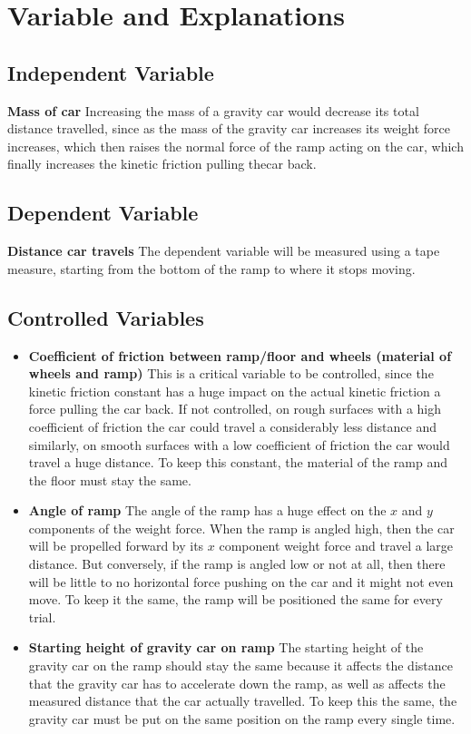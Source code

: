 \documentclass[12pt]{article}
\begin{document}
\section{Variable and Explanations}

\subsection{Independent Variable} \textbf{Mass of car} Increasing the mass of a gravity car would decrease its total distance travelled, since as the mass of the gravity car increases its weight force increases, which then raises the normal force of the ramp acting on the car, which finally increases the kinetic friction pulling thecar back.

\subsection{Dependent Variable} \textbf{Distance car travels} The dependent variable will be measured using a tape measure, starting from the bottom of the ramp to where it stops moving.

\subsection{Controlled Variables}
\begin{itemize}
	\item \textbf{Coefficient of friction between ramp/floor and wheels (material of wheels and ramp)} This is a critical variable to be controlled, since the kinetic friction constant has a huge impact on the actual kinetic friction a force pulling the car back. If not controlled, on rough surfaces with a high coefficient of friction the car could travel a considerably less distance and similarly, on smooth surfaces with a low coefficient of friction the car would travel a huge distance. To keep this constant, the material of the ramp and the floor must stay the same.
	\item \textbf{Angle of ramp} The angle of the ramp has a huge effect on the \(x\) and \(y\) components of the weight force. When the ramp is angled high, then the car will be propelled forward by its \(x\) component weight force and travel a large distance. But conversely, if the ramp is angled low or not at all, then there will be little to no horizontal force pushing on the car and it might not even move. To keep it the same, the ramp will be positioned the same for every trial.
	\item \textbf{Starting height of gravity car on ramp} The starting height of the gravity car on the ramp should stay the same because it affects the distance that the gravity car has to accelerate down the ramp, as well as affects the measured distance that the car actually travelled. To keep this the same, the gravity car must be put on the same position on the ramp every single time.
\end{itemize}
\end{document}
